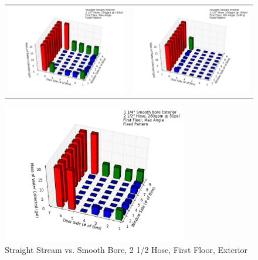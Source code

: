 \documentclass{article}
\begin{document}
\begin{appendices}
\begin{figure}[ht]
\begin{tabular*}{\textwidth}{lr}
\includegraphics[width=3.2in]{../ADD_Analysis/Figures/15-12-08_140501_Datafile_Straight_Stream_Exterior.png} &
\includegraphics[width=3.2in]{../ADD_Analysis/Figures/15-12-08_142655_Datafile_Straight_Stream_Exterior.png} \\
\end{tabular*}
\centering
\includegraphics[width=3.2in]{../ADD_Analysis/Figures/15-12-08_144238_Datafile_1_1_4in_Smooth_Bore_Exterior.png}
\caption{Straight Stream vs. Smooth Bore, 2 1/2 Hose, First Floor, Exterior}
\label{fig:Straight Stream vs. Smooth Bore, 2 1/2 Hose, First Floor Exterior}
\end{figure}


\end{appendices}
\end{document}
